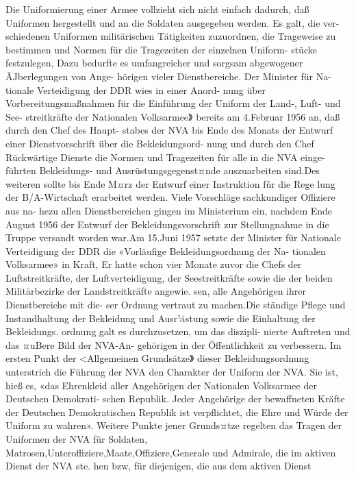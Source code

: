 

Die Uniformierung einer Armee vollzieht sich nicht
einfach dadurch, daß Uniformen hergestellt und an
die Soldaten ausgegeben werden. Es galt, die ver-
schiedenen Uniformen militärischen Tätigkeiten
zuzuordnen, die Trageweise zu bestimmen und
Normen für die Tragezeiten der einzelnen Uniform-
stücke festzulegen, Dazu bedurfte es umfangreicher
und sorgsam abgewogener ÃJberlegungen von Ange-
hörigen vieler Dienstbereiche. Der Minister für Na-
tionale Verteidigung der DDR wies in einer Anord-
nung über Vorbereitungsmaßnahmen für die
Einführung der Uniform der Land-, Luft- und See-
streitkräfte der Nationalen Volksarmee》 bereits am
4.Februar 1956 an, daß durch den Chef des Haupt-
stabes der NVA bis Ende des Monats der Entwurf
einer Dienstvorschrift über die Bekleidungsord-
nung und durch den Chef Rückwärtige Dienste die Normen und Tragezeiten für alle in die NVA einge-
führten Bekleidungs- und Ausrüstungsgegenst¤nde
auszuarbeiten sind.Des weiteren sollte bis Ende
M¤rz der Entwurf einer Instruktion fǔr die Rege
lung der B/A-Wirtschaft erarbeitet werden.
Viele Vorschläge sachkundiger Offiziere aus na-
hezu allen Dienstbereichen gingen im Ministerium
ein, nachdem Ende August 1956 der Entwurf der
Bekleidungsvorschrift zur Stellungnahme in die
Truppe versandt worden war.Am 15.Juni 1957
setzte der Minister für Nationale Verteidigung der
DDR die «Vorläufige Bekleidungsordnung der Na-
tionalen Volksarmee» in Kraft, Er hatte schon vier
Monate zuvor die Chefs der Luftstreitkräfte, der
Luftverteidigung, der Seestreitkräfte sowie die der beiden Militärbezirke der Landstreitkräfte angewie.
sen, alle Angehörigen ihrer Dienstbereiche mit die-
ser Ordnung vertraut zu machen.Die ständige
Pflege und Instandhaltung der Bekleidung und
Ausr¼stung sowie die Einhaltung der Bekleidungs.
ordnung galt es durchzusetzen, um das diszipli-
nierte Auftreten und das ¤uBere Bild der NVA-An-
gehörigen in der Öffentlichkeit zu verbessern.
Im ersten Punkt der <Allgemeinen Grundsätze》
dieser Bekleidungsordnung unterstrich die Führung
der NVA den Charakter der Uniform der NVA. Sie
ist, hieß es, «das Ehrenkleid aller Angehörigen der
Nationalen Volksarmee der Deutschen Demokrati-
schen Republik. Jeder Angehörige der bewaffneten
Kräfte der Deutschen Demokratischen Republik ist
verpflichtet, die Ehre und Würde der Uniform zu
wahren».
Weitere Punkte jener Grunds¤tze regelten das
Tragen der Uniformen der NVA für Soldaten, Matrosen,Unteroffiziere,Maate,Offiziere,Generale
und Admirale, die im aktiven Dienst der NVA ste.
hen bzw, für diejenigen, die aus dem aktiven Dienst

